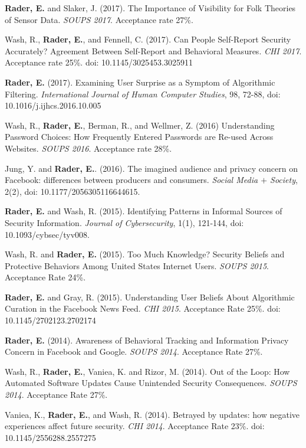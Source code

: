 \documentclass[9pt]{extarticle}
\begin{document}
\textbf{Rader, E.} and Slaker, J. (2017). The Importance of Visibility for Folk Theories of Sensor Data. \emph{SOUPS 2017}. Acceptance rate 27\%. 

Wash, R., \textbf{Rader, E.}, and Fennell, C. (2017). Can People Self-Report Security Accurately? Agreement Between Self-Report and Behavioral Measures. \emph{CHI 2017}. Acceptance rate 25\%. doi: 10.1145/3025453.3025911

\textbf{Rader, E.} (2017). Examining User Surprise as a Symptom of Algorithmic Filtering. \emph{International Journal of Human Computer Studies}, 98, 72-88, doi: 10.1016/j.ijhcs.2016.10.005

Wash, R., \textbf{Rader, E.}, Berman, R., and Wellmer, Z. (2016) Understanding Password Choices: How Frequently Entered Passwords are Re-used Across Websites. \emph{SOUPS 2016}. Acceptance rate 28\%.

Jung, Y. and \textbf{Rader, E.}. (2016). The imagined audience and privacy concern on Facebook: differences between producers and consumers. \emph{Social Media $+$ Society}, 2(2), doi: 10.1177/2056305116644615.

\textbf{Rader, E.} and Wash, R. (2015). Identifying Patterns in Informal Sources of Security Information. \emph{Journal of Cybersecurity}, 1(1), 121-144, doi: 10.1093/cybsec/tyv008.

Wash, R. and \textbf{Rader, E.} (2015). Too Much Knowledge? Security Beliefs and Protective Behaviors Among United States Internet Users. \emph{SOUPS 2015}. Acceptance Rate 24\%.

\textbf{Rader, E.} and Gray, R. (2015). Understanding User Beliefs About Algorithmic Curation in the Facebook News Feed. \emph{CHI 2015}. Acceptance Rate 25\%. doi: 10.1145/2702123.2702174

\textbf{Rader, E.} (2014). Awareness of Behavioral Tracking and Information Privacy Concern in Facebook and Google. \emph{SOUPS 2014}. Acceptance Rate 27\%.

Wash, R., \textbf{Rader, E.}, Vaniea, K. and Rizor, M. (2014). Out of the Loop: How Automated Software Updates Cause Unintended Security Consequences. \emph{SOUPS 2014}. Acceptance Rate 27\%.

Vaniea, K., \textbf{Rader, E.}, and Wash, R. (2014). Betrayed by updates: how negative experiences affect future security. \emph{CHI 2014}. Acceptance Rate 23\%. doi: 10.1145/2556288.2557275
\end{document}
